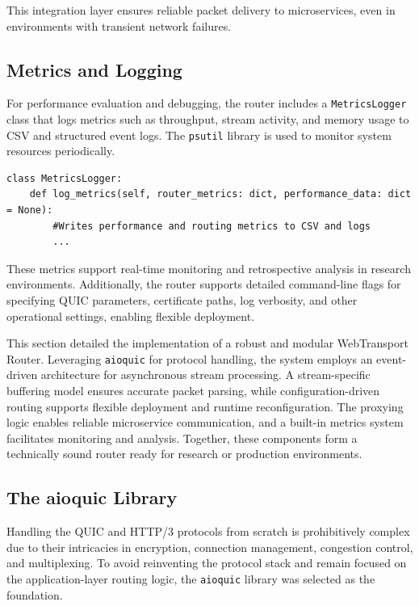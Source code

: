 This integration layer ensures reliable packet delivery to microservices, even in environments with transient network failures.

\subsection{Metrics and Logging}
For performance evaluation and debugging, the router includes a \texttt{MetricsLogger} class that logs metrics such as throughput, stream activity, and memory usage to CSV and structured event logs. The \texttt{psutil} library is used to monitor system resources periodically.

\begin{lstlisting}[breaklines=true,basicstyle=\small\ttfamily,frame=single]
class MetricsLogger:
    def log_metrics(self, router_metrics: dict, performance_data: dict = None):
        #Writes performance and routing metrics to CSV and logs
        ...
\end{lstlisting}

These metrics support real-time monitoring and retrospective analysis in research environments. Additionally, the router supports detailed command-line flags for specifying QUIC parameters, certificate paths, log verbosity, and other operational settings, enabling flexible deployment.

This section detailed the implementation of a robust and modular WebTransport Router. Leveraging \texttt{aioquic} for protocol handling, the system employs an event-driven architecture for asynchronous stream processing. A stream-specific buffering model ensures accurate packet parsing, while configuration-driven routing supports flexible deployment and runtime reconfiguration. The proxying logic enables reliable microservice communication, and a built-in metrics system facilitates monitoring and analysis. Together, these components form a technically sound router ready for research or production environments.





\subsection{The aioquic Library}

Handling the QUIC and HTTP/3 protocols from scratch is prohibitively complex due to their intricacies in encryption, connection management, congestion control, and multiplexing. To avoid reinventing the protocol stack and remain focused on the application-layer routing logic, the \texttt{aioquic} library was selected as the foundation.

